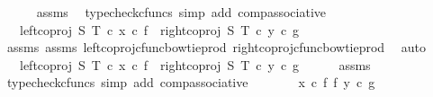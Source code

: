 \begin{isabellebody}
\ \ \ \ \isamarkupfalse%
\ assms\ \isamarkupfalse%
\ {\isacharparenleft}{\kern0pt}typecheck{\isacharunderscore}{\kern0pt}cfuncs{\isacharcomma}{\kern0pt}\ simp\ add{\isacharcolon}{\kern0pt}\ comp{\isacharunderscore}{\kern0pt}associative{}{\isacharparenright}{\kern0pt}\isanewline
\ \ \isamarkupfalse%
\ \isamarkupfalse%
\ {\isachardoublequoteopen}{\isachardot}{\kern0pt}{\isachardot}{\kern0pt}{\isachardot}{\kern0pt}\ {\isacharequal}{\kern0pt}\ {\isacharparenleft}{\kern0pt}{\isacharparenleft}{\kern0pt}left{\isacharunderscore}{\kern0pt}coproj\ S\ T\ {\isasymcirc}\isactrlsub c\ x{\isacharparenright}{\kern0pt}\ {\isasymcirc}\isactrlsub c\ f{\isacharparenright}{\kern0pt}\ {\isasymamalg}\ {\isacharparenleft}{\kern0pt}{\isacharparenleft}{\kern0pt}right{\isacharunderscore}{\kern0pt}coproj\ S\ T\ {\isasymcirc}\isactrlsub c\ y{\isacharparenright}{\kern0pt}\ {\isasymcirc}\isactrlsub c\ g{\isacharparenright}{\kern0pt}{\isachardoublequoteclose}\isanewline
\ \ \ \ \isamarkupfalse%
\ assms{\isacharparenleft}{\kern0pt}{}{\isacharparenright}{\kern0pt}\ assms{\isacharparenleft}{\kern0pt}{}{\isacharparenright}{\kern0pt}\ left{\isacharunderscore}{\kern0pt}coproj{\isacharunderscore}{\kern0pt}cfunc{\isacharunderscore}{\kern0pt}bowtie{\isacharunderscore}{\kern0pt}prod\ right{\isacharunderscore}{\kern0pt}coproj{\isacharunderscore}{\kern0pt}cfunc{\isacharunderscore}{\kern0pt}bowtie{\isacharunderscore}{\kern0pt}prod\ \isamarkupfalse%
\ auto\isanewline
\ \ \isamarkupfalse%
\ \isamarkupfalse%
\ {\isachardoublequoteopen}{\isachardot}{\kern0pt}{\isachardot}{\kern0pt}{\isachardot}{\kern0pt}\ {\isacharequal}{\kern0pt}\ {\isacharparenleft}{\kern0pt}left{\isacharunderscore}{\kern0pt}coproj\ S\ T\ {\isasymcirc}\isactrlsub c\ x\ {\isasymcirc}\isactrlsub c\ f{\isacharparenright}{\kern0pt}\ {\isasymamalg}\ {\isacharparenleft}{\kern0pt}right{\isacharunderscore}{\kern0pt}coproj\ S\ T\ {\isasymcirc}\isactrlsub c\ y\ {\isasymcirc}\isactrlsub c\ g{\isacharparenright}{\kern0pt}{\isachardoublequoteclose}\isanewline
\ \ \ \ \isamarkupfalse%
\ assms\ \isamarkupfalse%
\ {\isacharparenleft}{\kern0pt}typecheck{\isacharunderscore}{\kern0pt}cfuncs{\isacharcomma}{\kern0pt}\ simp\ add{\isacharcolon}{\kern0pt}\ comp{\isacharunderscore}{\kern0pt}associative{}{\isacharparenright}{\kern0pt}\isanewline
\ \ \isamarkupfalse%
\ \isamarkupfalse%
\ {\isachardoublequoteopen}{\isachardot}{\kern0pt}{\isachardot}{\kern0pt}{\isachardot}{\kern0pt}\ {\isacharequal}{\kern0pt}\ {\isacharparenleft}{\kern0pt}x\ {\isasymcirc}\isactrlsub c\ f{\isacharparenright}{\kern0pt}\ {\isasymbowtie}\isactrlsub f\ {\isacharparenleft}{\kern0pt}y\ {\isasymcirc}\isactrlsub c\ g{\isacharparenright}{\kern0pt}{\isachardoublequoteclose}\isanewline

\end{isabellebody}
